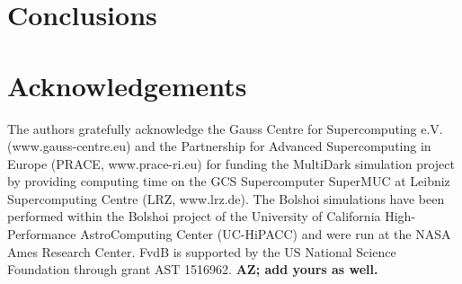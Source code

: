 \documentclass[usenatbib,usegraphicx,letterpaper]{mn2e}
\begin{document}


\section{Conclusions}
\label{section:conclusions}

\section{Acknowledgements}
\label{section:acknowledgements}

The authors gratefully acknowledge the Gauss Centre for Supercomputing
e.V. (www.gauss-centre.eu) and the Partnership for Advanced
Supercomputing in Europe (PRACE, www.prace-ri.eu) for funding the
MultiDark simulation project by providing computing time on the GCS
Supercomputer SuperMUC at Leibniz Supercomputing Centre (LRZ,
www.lrz.de). The Bolshoi simulations have been performed within the
Bolshoi project of the University of California High-Performance
AstroComputing Center (UC-HiPACC) and were run at the NASA Ames
Research Center. FvdB is supported by the US National Science
Foundation through grant AST 1516962. {\bf AZ; add yours as well.}





\end{document}
